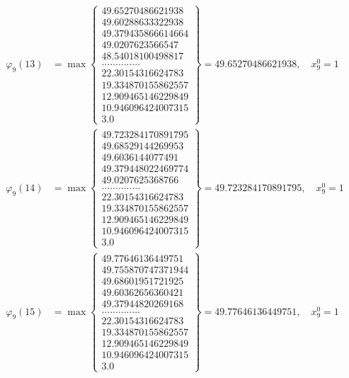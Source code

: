 \documentclass{article}
\begin{document}
\begin{align*}
  
  
  
\varphi_{9}(13) &= \max \left\{ \begin{array}{c}
49.65270486621938 \\
 49.60288633322938 \\
 49.379435866614664 \\
 49.0207623566547 \\
 48.54018100498817 \\
 .............. \\
 22.30154316624783 \\
 19.334870155862557 \\
 12.909465146229849 \\
 10.946096424007315 \\
 3.0
\end{array} \right\} = 49.65270486621938, \quad x_{9}^0 = 1\\
  
  
  
  
\varphi_{9}(14) &= \max \left\{ \begin{array}{c}
49.723284170891795 \\
 49.68529144269953 \\
 49.6036144077491 \\
 49.379448022469774 \\
 49.0207625368766 \\
 .............. \\
 22.30154316624783 \\
 19.334870155862557 \\
 12.909465146229849 \\
 10.946096424007315 \\
 3.0
\end{array} \right\} = 49.723284170891795, \quad x_{9}^0 = 1\\
  
  
  
  
\varphi_{9}(15) &= \max \left\{ \begin{array}{c}
49.77646136449751 \\
 49.755870747371944 \\
 49.68601951721925 \\
 49.60362656360421 \\
 49.37944820269168 \\
 .............. \\
 22.30154316624783 \\
 19.334870155862557 \\
 12.909465146229849 \\
 10.946096424007315 \\
 3.0
\end{array} \right\} = 49.77646136449751, \quad x_{9}^0 = 1\\
  

\end{align*}
\end{document}
